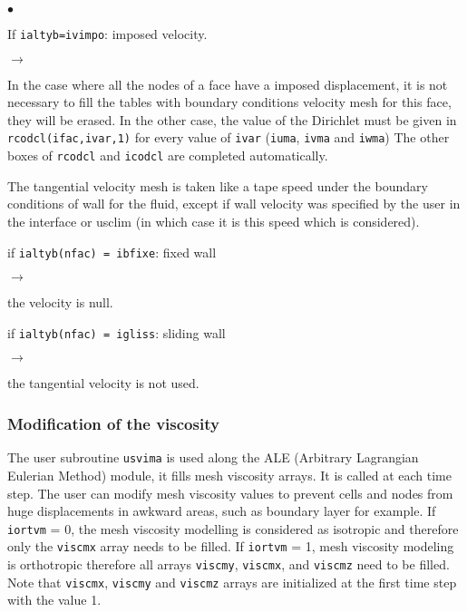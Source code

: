 {{{{\begin{list}{$\bullet$}{}

\item If \texttt{ialtyb=ivimpo}: imposed velocity.

\begin{list}{$\rightarrow$}{}
\item In the case where all the nodes of a face have a imposed displacement,
 it is not necessary to fill the tables with boundary conditions
 velocity mesh for this face, they will be erased. In the other case,
 the value of the Dirichlet must be given in \texttt{rcodcl(ifac,ivar,1)} for
 every value of \texttt{ivar} (\texttt{iuma}, \texttt{ivma} and \texttt{iwma})
 The other boxes of \texttt{rcodcl} and \texttt{icodcl} are completed automatically.

 The tangential velocity mesh is taken like a tape speed under the
 boundary conditions of wall for the fluid, except if wall velocity
 was specified by the user in the interface or usclim (in which case
 it is this speed which is considered).
\end{list}

 \item if \texttt{ialtyb(nfac) = ibfixe}: fixed wall
\begin{list}{$\rightarrow$}{}
 \item the velocity is null.
\end{list}

 \item if \texttt{ialtyb(nfac) = igliss}:  sliding wall
\begin{list}{$\rightarrow$}{}
\item the tangential velocity is not used.
\end{list}

\end{list}
}

\subsubsection{Modification of the viscosity}

The user subroutine \texttt{usvima} is used along the ALE (Arbitrary Lagrangian Eulerian
 Method) module, it fills mesh viscosity arrays. It is called at each time step.
The user can modify mesh viscosity values to prevent cells and nodes from huge
 displacements in awkward areas, such as boundary layer for example.
If \texttt{iortvm} = 0, the mesh viscosity modelling is considered as isotropic and
 therefore only the \texttt{viscmx} array needs to be filled.
If \texttt{iortvm} = 1, mesh viscosity modeling is orthotropic therefore all arrays
 \texttt{viscmy}, \texttt{viscmx}, and \texttt{viscmz} need to be filled.
Note that \texttt{viscmx}, \texttt{viscmy} and \texttt{viscmz} arrays are initialized
 at the first time step with the value 1.

}}}
